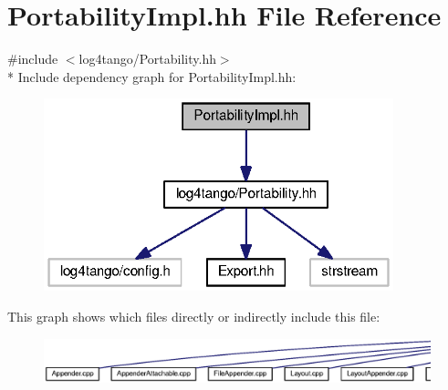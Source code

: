 \section{Portability\-Impl.\-hh File Reference}
\label{PortabilityImpl_8hh}
{\ttfamily \#include $<$log4tango/\-Portability.\-hh$>$}\\*
Include dependency graph for Portability\-Impl.\-hh\-:
\nopagebreak
\begin{figure}[H]
\begin{center}
\leavevmode
\includegraphics[width=287pt]{d4/d01/PortabilityImpl_8hh__incl}
\end{center}
\end{figure}
This graph shows which files directly or indirectly include this file\-:
\nopagebreak
\begin{figure}[H]
\begin{center}
\leavevmode
\includegraphics[width=350pt]{d3/ddc/PortabilityImpl_8hh__dep__incl}
\end{center}
\end{figure}
